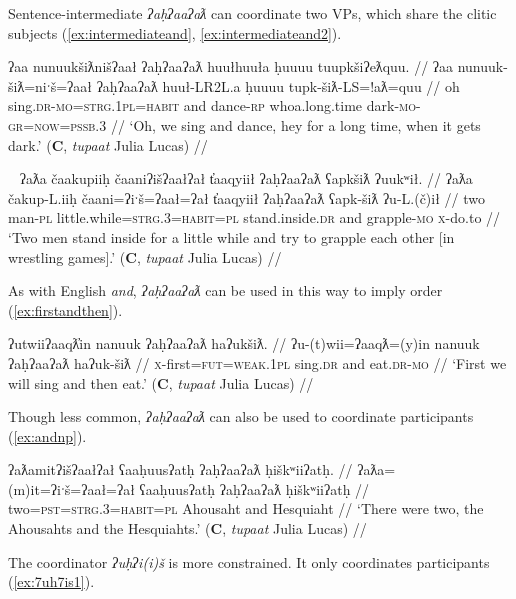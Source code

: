 Sentence-intermediate \textit{ʔaḥʔaaʔaƛ} can coordinate two VPs, which share the clitic subjects (\ref{ex:intermediateand}, \ref{ex:intermediateand2}).

\ex \label{ex:intermediateand}
\begingl
\glpreamble ʔaa nunuukšiƛnišʔaał ʔaḥʔaaʔaƛ huułhuuła ḥuuuu tuupkšiʔeƛquu. //
\gla ʔaa nunuuk-šiƛ=niˑš=ʔaał ʔaḥʔaaʔaƛ huuł-LR2L.a ḥuuuu tupk-šiƛ-LS=!aƛ=quu //
\glb oh sing.\textsc{dr}-\textsc{mo}=\textsc{strg.1pl}=\textsc{habit} and dance-\textsc{rp} whoa.long.time dark-\textsc{mo}-\textsc{gr}=\textsc{now}=\textsc{pssb.3} //
\glft `Oh, we sing and dance, hey for a long time, when it gets dark.' (\textbf{C}, \textit{tupaat} Julia Lucas) //
\endgl
\xe


\ex~ \label{ex:intermediateand2}
\begingl
\glpreamble ʔaƛa čaakupiiḥ čaaniʔišʔaałʔał t̓aaqyiił ʔaḥʔaaʔaƛ ʕapkšiƛ ʔuukʷił. //
\gla ʔaƛa čakup-L.iiḥ čaani=ʔiˑš=ʔaał=ʔał t̓aaqyiił ʔaḥʔaaʔaƛ ʕapk-šiƛ ʔu-L.(č)ił //
\glb two man-\textsc{pl} little.while=\textsc{strg.3}=\textsc{habit}=\textsc{pl} stand.inside.\textsc{dr} and grapple-\textsc{mo} \textsc{x}-do.to //
\glft `Two men stand inside for a little while and try to grapple each other [in wrestling games].' (\textbf{C}, \textit{tupaat} Julia Lucas) //
\endgl
\xe

As with English \textit{and}, \textit{ʔaḥʔaaʔaƛ} can be used in this way to imply order (\ref{ex:firstandthen}).

\ex \label{ex:firstandthen}
\begingl
\glpreamble ʔutwiiʔaaqƛ̓in nanuuk ʔaḥʔaaʔaƛ haʔukšiƛ. //
\gla ʔu-(t)wii=ʔaaqƛ=(y)in nanuuk ʔaḥʔaaʔaƛ haʔuk-šiƛ //
\glb \textsc{x}-first=\textsc{fut}=\textsc{weak.1pl} sing.\textsc{dr} and eat.\textsc{dr}-\textsc{mo} //
\glft `First we will sing and then eat.' (\textbf{C}, \textit{tupaat} Julia Lucas) //
\endgl
\xe

Though less common, \textit{ʔaḥʔaaʔaƛ} can also be used to coordinate participants (\ref{ex:andnp}).

\ex \label{ex:andnp}
\begingl
\glpreamble ʔaƛamitʔišʔaałʔał ʕaaḥuusʔatḥ ʔaḥʔaaʔaƛ ḥiškʷiiʔatḥ. //
\gla ʔaƛa=(m)it=ʔiˑš=ʔaał=ʔał ʕaaḥuusʔatḥ ʔaḥʔaaʔaƛ ḥiškʷiiʔatḥ //
\glb two=\textsc{pst}=\textsc{strg.3}=\textsc{habit}=\textsc{pl} Ahousaht and Hesquiaht //
\glft `There were two, the Ahousahts and the Hesquiahts.' (\textbf{C}, \textit{tupaat} Julia Lucas) //
\endgl
\xe

The coordinator \textit{ʔuḥʔi(i)š} is more constrained. It only coordinates participants (\ref{ex:7uh7is1}).

